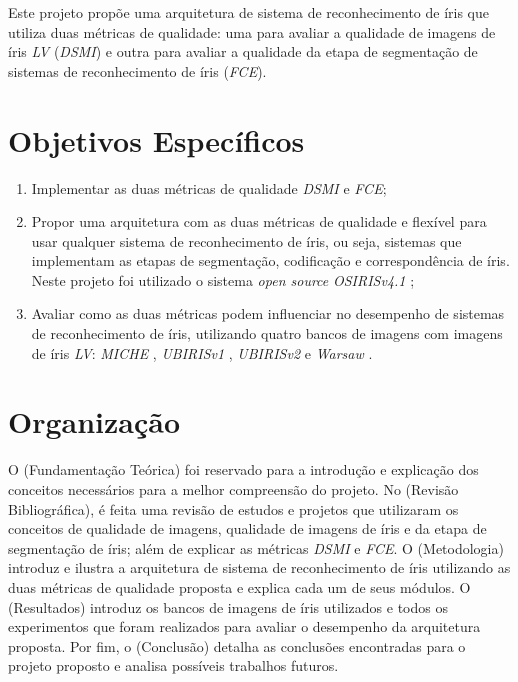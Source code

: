 \par Este projeto propõe uma arquitetura de sistema de reconhecimento de íris que utiliza duas métricas de qualidade: uma para avaliar a qualidade de imagens de íris \textit{\acrshort{LV}} (\textit{\acrshort{DSMI}}) e outra para avaliar a qualidade da etapa de segmentação de sistemas de reconhecimento de íris (\textit{\acrshort{FCE}}).

\section{Objetivos Específicos}

\begin{enumerate}
    \item Implementar as duas métricas de qualidade \textit{\acrshort{DSMI}} e \textit{\acrshort{FCE}};
    \item Propor uma arquitetura com as duas métricas de qualidade e flexível para usar qualquer sistema de reconhecimento de íris, ou seja, sistemas que implementam as etapas de segmentação, codificação e correspondência de íris. Neste projeto foi utilizado o sistema \textit{open source} \textit{OSIRISv4.1} \cite{othman2015};
    \item Avaliar como as duas métricas podem influenciar no desempenho de sistemas de reconhecimento de íris, utilizando quatro bancos de imagens com imagens de íris \textit{\acrshort{LV}}: \textit{MICHE} \cite{marsico2017-MICHE-1}, \textit{UBIRISv1} \cite{proenca2005-ubirisv1}, \textit{UBIRISv2} \cite{proence2010-ubirisv2} e \textit{\acrfull{Warsaw}} \cite{trokielwicz2016-Warsaw}.
\end{enumerate}


\section{Organização}

\par O  (Fundamentação Teórica) foi reservado para a introdução e explicação dos conceitos necessários para a melhor compreensão do projeto. No  (Revisão Bibliográfica), é feita uma revisão de estudos e projetos que utilizaram os conceitos de qualidade de imagens, qualidade de imagens de íris e da etapa de segmentação de íris; além de explicar as métricas \textit{\acrshort{DSMI}} e \textit{\acrshort{FCE}}. O  (Metodologia) introduz e ilustra a arquitetura de sistema de reconhecimento de íris utilizando as duas métricas de qualidade proposta e explica cada um de seus módulos. O  (Resultados) introduz os bancos de imagens de íris utilizados e todos os experimentos que foram realizados para avaliar o desempenho da arquitetura proposta. Por fim, o  (Conclusão) detalha as conclusões encontradas para o projeto proposto e analisa possíveis trabalhos futuros.